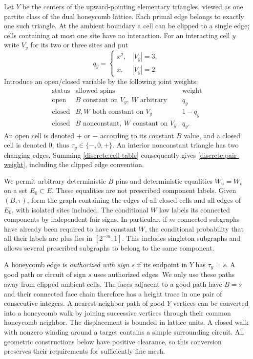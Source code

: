 \documentclass[11pt]{article}
\theoremstyle{definition}
\theoremstyle{remark}
\numberwithin{equation}{section}
\begin{document}
Let $Y$ be the centers of the upward-pointing elementary triangles, viewed
as one partite class of the dual honeycomb lattice. Each primal edge belongs
to exactly one such triangle. At the ambient boundary a cell can be clipped
to a single edge; cells containing at most one site have no interaction.
For an interacting cell $y$ write $V_y$ for its two or three sites and put
\[
 q_y=\begin{cases}x^2,&|V_y|=3,\\ x,&|V_y|=2.\end{cases}
\]
Introduce an open/closed variable by the following joint weights:
\begin{equation}\label{discrete:cell-table}
\begin{array}{c|c|c}
 \text{status}&\text{allowed spins}&\text{weight}\\ \hline
 \text{open}&B\text{ constant on }V_y,\ W\text{ arbitrary}&q_y\\
 \text{closed}&B,W\text{ both constant on }V_y&1-q_y\\
 \text{closed}&B\text{ nonconstant},\ W\text{ constant on }V_y&q_y.
\end{array}
\end{equation}
An open cell is denoted $+$ or $-$ according to its constant $B$ value,
and a closed cell is denoted $0$; thus $\tau_y\in\{-,0,+\}$.
An interior nonconstant triangle has two changing edges. Summing
\eqref{discrete:cell-table} consequently gives
\eqref{discrete:pair-weight}, including the clipped edge convention.

We permit arbitrary deterministic $B$ pins and deterministic equalities
$W_u=W_v$ on a set $E_0\subset E$. These equalities are not prescribed
component labels. Given $(B,\tau)$, form the graph containing the edges of
all closed cells and all edges of $E_0$, with isolated sites included.
The conditional $W$ law labels its connected components by independent
fair signs. In particular, if $m$ connected subgraphs have already been
required to have constant $W$, the conditional probability that all their
labels are plus lies in $[2^{-m},1]$. This includes singleton subgraphs and
allows several prescribed subgraphs to belong to the same component.

A honeycomb edge is \emph{authorized with sign $s$} if its endpoint in $Y$
has $\tau_y=s$. A good path or circuit of sign $s$ uses authorized edges.
We only use these paths away from clipped ambient cells. The faces adjacent
to a good path have $B=s$ and their connected face chain therefore has a
height trace in one pair of consecutive integers. A nearest-neighbor path
of good $Y$ vertices can be converted into a honeycomb walk by joining
successive vertices through their common honeycomb neighbor. The
displacement is bounded in lattice units. A closed walk with nonzero winding
around a target contains a simple surrounding circuit. All geometric
constructions below have positive clearance, so this conversion preserves
their requirements for sufficiently fine mesh.
\end{document}
